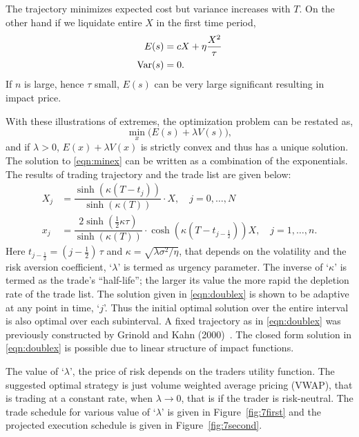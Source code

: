 The trajectory minimizes expected cost but variance increases with $T$. On the other hand if we liquidate entire $X$ in the first time period,
	\begin{equation}\label{eqn:anotherdoubleex}
	\begin{split}
	E(s)&= c X + \eta \frac{X^2}{\tau} \\
	\var(s)&= 0.
	\end{split}
	\end{equation}
If $n$ is large, hence $\tau$ small, $E(s)$ can be very large significant resulting in impact price.


 With these illustrations of extremes, the optimization problem can be restated as,
	\begin{equation}\label{eqn:minex}
	\min_x\big( E(s) + \lambda V(s) \big),
	\end{equation}
and if $\lambda>0$, $E(x)+\lambda V(x)$ is strictly convex and thus has a unique solution. The solution to \eqref{eqn:minex} can be written as a combination of the exponentials. The results of trading trajectory and the trade list are given below:
	\begin{equation}\label{eqn:doublex}
	\begin{split}
	X_j &= \dfrac{\sinh (\kappa(T-t_j))}{\sinh (\kappa(T))}\cdot X, \quad j=0,\ldots,N \\
	x_j &= \dfrac{2 \sinh (\frac{1}{2}\kappa\tau)}{\sinh (\kappa(T))}\cdot \cosh(\kappa(T-t_{j-\frac{1}{2}}))X, \quad j=1,\ldots, n.
	\end{split}
	\end{equation}
Here $t_{j - \frac{1}{2}} = (j - \frac{1}{2})\, \tau$ and $\kappa = \sqrt{\lambda \sigma^2 / \eta}$, that depends on the volatility and the risk aversion coefficient, `$\lambda$' is termed as urgency parameter. The inverse of `$\kappa$' is termed as the trade's ``half-life''; the larger its value the more rapid the depletion rate of the trade list. The solution given in \eqref{eqn:doublex} is shown to be adaptive at any point in time, `$j$'. Thus the initial optimal solution over the entire interval is also optimal over each subinterval. A fixed trajectory as in \eqref{eqn:doublex} was previously constructed by Grinold and Kahn (2000)~\cite{grin2000}. The closed form solution in \eqref{eqn:doublex} is possible due to linear structure of impact functions. 


The value of `$\lambda$', the price of risk depends on the traders utility function. The suggested optimal strategy is just volume weighted average pricing (VWAP), that is trading at a constant rate, when $\lambda \to 0$, that is if the trader is risk-neutral. The trade schedule for various value of `$\lambda$' is given in Figure~\ref{fig:7first} and the projected execution schedule is given in Figure~\ref{fig:7second}. 


